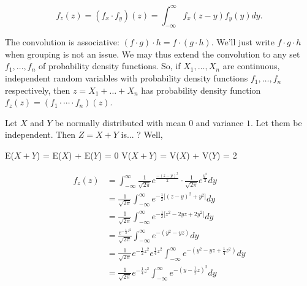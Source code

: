 \documentclass[12pt]{article}
\begin{document}
\begin{equation*}
f_z(z) = (f_x \cdot f_y)(z) = \int_{- \infty}^{\infty} f_x (z-y) f_y(y) dy.
\end{equation*}

\noindent
The convolution is associative: $(f \cdot g) \cdot h = f \cdot (g \cdot h)$. We'll just write $f \cdot g \cdot h$ when grouping is not an issue. We may thus extend the convolution to any set $f_1, \ldots, f_n$ of probability density functions. So, if $X_1, \ldots, X_n$ are continuous, independent random variables with probability density functions $f_1, \ldots, f_n$ respectively, then $z = X_1 + \ldots + X_n$ has probability density function $f_z(z) = (f_1 \cdot \cdots \cdot f_n) (z)$. 

\begin{tcolorbox}
Let $X$ and $Y$ be normally distributed with mean $0$ and variance $1$. Let them be independent. Then $Z = X + Y$ is... ? Well,

\begin{center}
E($X + Y$) = E($X$) + E($Y$) = 0 \qquad V($X + Y$) = V($X$) + V($Y$) = 2
\end{center}

\begin{align*}
f_z(z) &= \int_{- \infty}^{\infty} \frac{1}{\sqrt{2 \pi}} e^{\frac{-(z-y)^2}{2}} \cdot \frac{1}{\sqrt{2 \pi}} e^{\frac{y^2}{2}} dy \\
&= \frac{1}{\sqrt{2 \pi}} \int_{- \infty}^{\infty} e^{- \frac{1}{2} \big [ (z-y)^2 + y^2 \big ]} dy \\
&= \frac{1}{\sqrt{2 \pi}} \int_{- \infty}^{\infty} e^{- \frac{1}{2} \big [ z^2 -2yz + 2y^2 \big ]} dy \\
&= \frac{e^{- \frac{1}{2} z^2 }}{\sqrt{2 \pi}} \int_{- \infty}^{\infty} e^{- (y^2  - yz)} dy \\
&= \frac{1}{\sqrt{2 \pi}} e^{- \frac{1}{2} z^2 } e^{\frac{1}{4} z^2 } \int_{- \infty}^{\infty} e^{- (y^2  - yz + \frac{1}{4}z^2 )} dy \\
&= \frac{1}{\sqrt{2 \pi}} e^{- \frac{1}{4} z^2 } \int_{- \infty}^{\infty} e^{- (y  - \frac{1}{2}z)^2} dy \\
\end{align*}

\begin{center}
\end{center}
\end{tcolorbox}
\end{document}
